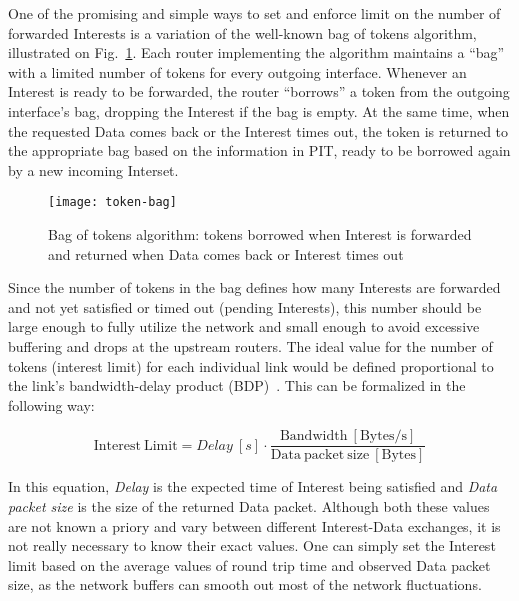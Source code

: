 
One of the promising and simple ways to set and enforce limit on the number of forwarded Interests is a variation of the well-known bag of tokens algorithm, illustrated on Fig.~\ref{fig:bag of tokens}.
Each router implementing the algorithm maintains a ``bag'' with a limited number of tokens for every outgoing interface.
Whenever an Interest is ready to be forwarded, the router ``borrows'' a token from the outgoing interface's bag, dropping the Interest if the bag is empty.
At the same time, when the requested Data comes back or the Interest times out, the token is returned to the appropriate bag based on the information in PIT, ready to be borrowed again by a new incoming Interset.

\begin{figure}[htbp]
  \centering
  \texttt{[image: token-bag]}
  \caption{Bag of tokens algorithm: tokens borrowed when Interest is forwarded and returned when Data comes back or Interest times out}
  \label{fig:bag of tokens}
\end{figure}

Since the number of tokens in the bag defines how many Interests are forwarded and not yet satisfied or timed out (pending Interests), this number should be large enough to fully utilize the network and small enough to avoid excessive buffering and drops at the upstream routers.
The ideal value for the number of tokens (interest limit) for each individual link would be defined proportional to the link's bandwidth-delay product (BDP)~\cite{tcp-survey}.
This can be formalized in the following way:

\begin{equation}
\mathrm{Interest\ Limit} = Delay\ [s] \cdot \frac{\mathrm{Bandwidth\ [Bytes/s]}}{\mathrm{Data\ packet\ size\ [Bytes]}}
\end{equation}

In this equation, \emph{Delay} is the expected time of Interest being satisfied and \emph{Data packet size} is the size of the returned Data packet.
Although both these values are not known a priory and vary between different Interest-Data exchanges, it is not really necessary to know their exact values.
One can simply set the Interest limit based on the average values of round trip time and observed Data packet size, as the network buffers can smooth out most of the network fluctuations.

